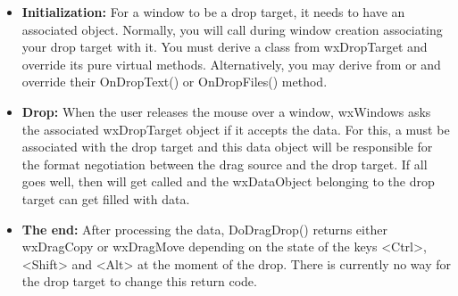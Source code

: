 \begin{itemize}\itemsep=0pt
\item {\bf Initialization:} For a window to be a drop target, it needs to have
an associated  object. Normally, you will
call  during window
creation associating your drop target with it. You must derive a class from
wxDropTarget and override its pure virtual methods. Alternatively, you may
derive from  or
 and override their OnDropText()
or OnDropFiles() method.
\item {\bf Drop:} When the user releases the mouse over a window, wxWindows
asks the associated wxDropTarget object if it accepts the data. For this,
a  must be associated with the drop target
and this data object will be responsible for the format negotiation between
the drag source and the drop target. If all goes well, then  
will get called and the wxDataObject belonging to the drop target can get 
filled with data.
\item {\bf The end:} After processing the data, DoDragDrop() returns either
wxDragCopy or wxDragMove depending on the state of the keys <Ctrl>, <Shift>
and <Alt> at the moment of the drop. There is currently no way for the drop
target to change this return code.
\end{itemize}

